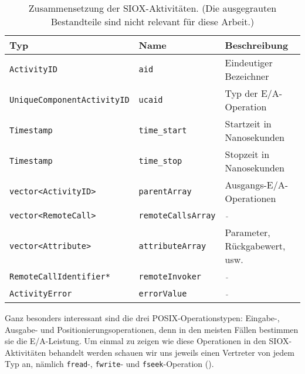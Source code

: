 \begin{table}[h]
	\centering
	\begin{scriptsize}
		\begin{tabular}{l | l | l}
			Typ & Name & Beschreibung \\
			\hline
			\lstinline{ActivityID}                                              & \lstinline{aid}                                                & Eindeutiger Bezeichner \\
			\lstinline{UniqueComponentActivityID}                               & \lstinline{ucaid}                                              & Typ der E/A-Operation \\
			\lstinline{Timestamp}                                               & \lstinline{time_start}                                         & Startzeit in Nanosekunden\\
			\lstinline{Timestamp}                                               & \lstinline{time_stop}                                          & Stopzeit in Nanosekunden \\
			\lstinline{vector<ActivityID>}                                      & \lstinline{parentArray}                                        & Ausgangs-E/A-Operationen \\
			\lstinline[basicstyle=\ttfamily\color{gray}]{vector<RemoteCall>}    & \lstinline[basicstyle=\ttfamily\color{gray}]{remoteCallsArray} & \textcolor{gray}{\textit{-}} \\
			\lstinline{vector<Attribute>}                                       & \lstinline{attributeArray}                                     & Parameter, Rückgabewert, usw. \\
			\lstinline[basicstyle=\ttfamily\color{gray}]{RemoteCallIdentifier*} & \lstinline[basicstyle=\ttfamily\color{gray}]{remoteInvoker}    & \textcolor{gray}{\textit{-}} \\
			\lstinline[basicstyle=\ttfamily\color{gray}]{ActivityError}         & \lstinline[basicstyle=\ttfamily\color{gray}]{errorValue}       & \textcolor{gray}{\textit{-}}
		\end{tabular}
	\end{scriptsize}
	\label{tab:des:activity}
	\caption{Zusammensetzung der SIOX-Aktivitäten. (Die ausgegrauten Bestandteile sind nicht relevant für diese Arbeit.)}
\end{table}

Ganz besonders interessant sind die drei POSIX-Operationstypen: Eingabe-, Ausgabe- und Positionierungsoperationen, denn in den meisten Fällen bestimmen sie die E/A-Leistung.
Um einmal zu zeigen wie diese Operationen in den SIOX-Aktivitäten behandelt werden schauen wir uns jeweils einen Vertreter von jedem Typ an, nämlich \lstinline{fread}-, \lstinline{fwrite}- und \lstinline{fseek}-Operation ().


